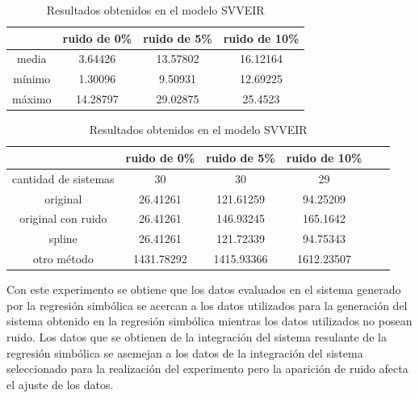 \begin{table}[!h]
    \centering
    \caption{Resultados obtenidos en el modelo SVVEIR}
    \begin{tabular}{|c|c|c|c|}
        \hline
               & \textbf{ruido de 0\%} & \textbf{ruido de 5\%} & \textbf{ruido de 10\%} \\
        \hline
        media  & 3.64426               & 13.57802              & 16.12164               \\
        \hline
        mínimo & 1.30096               & 9.50931               & 12.69225               \\
        \hline
        máximo & 14.28797              & 29.02875              & 25.4523                \\
        \hline
    \end{tabular}

    \begin{tabular}{|c|c|c|c|c|c|}
        \hline
                             & \textbf{ruido de 0\%} & \textbf{ruido de 5\%} & \textbf{ruido de 10\%} \\
        \hline
        cantidad de sistemas & 30                    & 30                    & 29                     \\
        \hline
        original             & 26.41261              & 121.61259             & 94.25209               \\
        \hline
        original con ruido   & 26.41261              & 146.93245             & 165.1642               \\
        \hline
        spline               & 26.41261              & 121.72339             & 94.75343               \\
        \hline
        otro método          & 1431.78292            & 1415.93366            & 1612.23507             \\
        \hline
    \end{tabular}
    \label{table:experiment_SVVEIR}
\end{table}

Con este experimento se obtiene que los datos evaluados en el sistema generado por la regresión simbólica se acercan a los datos utilizados para la generación del sistema obtenido en la regresión simbólica mientras los datos utilizados no posean ruido. Los datos que se obtienen de la integración del sistema resulante de la regresión simbólica se asemejan a los datos de la integración del sistema seleccionado para la realización del experimento pero la aparición de ruido afecta el ajuste de los datos.


